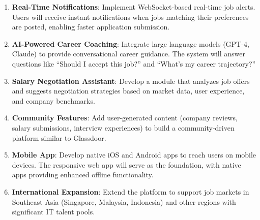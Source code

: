 \documentclass[12pt,a4paper,oneside]{report}
\begin{document}
\begin{enumerate}
    \item \textbf{Real-Time Notifications}: Implement WebSocket-based real-time job alerts. Users will receive instant notifications when jobs matching their preferences are posted, enabling faster application submission.
    
    \item \textbf{AI-Powered Career Coaching}: Integrate large language models (GPT-4, Claude) to provide conversational career guidance. The system will answer questions like ``Should I accept this job?'' and ``What's my career trajectory?''
    
    \item \textbf{Salary Negotiation Assistant}: Develop a module that analyzes job offers and suggests negotiation strategies based on market data, user experience, and company benchmarks.
    
    \item \textbf{Community Features}: Add user-generated content (company reviews, salary submissions, interview experiences) to build a community-driven platform similar to Glassdoor.
    
    \item \textbf{Mobile App}: Develop native iOS and Android apps to reach users on mobile devices. The responsive web app will serve as the foundation, with native apps providing enhanced offline functionality.
    
    \item \textbf{International Expansion}: Extend the platform to support job markets in Southeast Asia (Singapore, Malaysia, Indonesia) and other regions with significant IT talent pools.
\end{enumerate}
\end{document}
